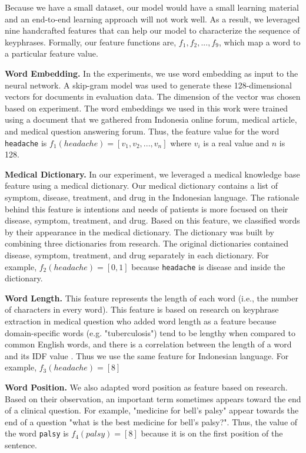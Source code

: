 Because we have a small dataset, our model would have a small learning material and an end-to-end learning approach will not work well. As a result, we leveraged nine handcrafted features that can help our model to characterize the sequence of keyphrases. Formally, our feature functions are, $f_1, f_2, ..., f_9$, which map a word to a particular feature value.

\textbf{Word Embedding.} In the experiments, we use word embedding as input to the neural network. A skip-gram model \cite{mikolov2013wordembed} was used to generate these 128-dimensional vectors for documents in evaluation data. The dimension of the vector was chosen based on \cite{skripsiWahid} experiment. The word embeddings we used in this work were trained using a document that we gathered from Indonesia online forum, medical article, and medical question answering forum. Thus, the feature value for the word \texttt{headache} is $f_1(headache) = [v_1, v_2, ..., v_n]$ where $v_i$ is a real value and $n$ is 128.

\textbf{Medical Dictionary.} In our experiment, we leveraged a medical knowledge base feature using a medical dictionary. Our medical dictionary contains a list of symptom, disease, treatment, and drug in the Indonesian language. The rationale behind this feature is intentions and needs of patients is more focused on their disease, symptom, treatment, and drug. Based on this feature, we classified words by their appearance in the medical dictionary. The dictionary was built by combining three dictionaries from \cite{skripsiKakAbid} research. The original dictionaries contained disease, symptom, treatment, and drug separately in each dictionary. For example, $f_2(headache) = [0, 1]$ because \texttt{headache} is disease and inside the dictionary.

\textbf{Word Length.} This feature represents the length of each word (i.e., the number of characters in every word). This feature is based on \cite{cao2010automatically} research on keyphrase extraction in medical question who added word length as a feature because domain-specific words (e.g. "tuberculosis") tend to be lengthy when compared to common English words, and there is a correlation between the length of a word and its IDF value \citep{cao2010automatically}. Thus we use the same feature for Indonesian language. For example, $f_3(headache) = [8]$

\textbf{Word Position.} We also adapted word position as feature based on \cite{cao2010automatically}research. Based on their observation, an important term sometimes appears toward the end of a clinical question. For example, "medicine for bell's palsy" appear towards the end of a question "what is the best medicine for bell's palsy?". Thus, the value of the word \texttt{palsy} is $f_4(palsy) = [8]$ because it is on the first position of the sentence.

